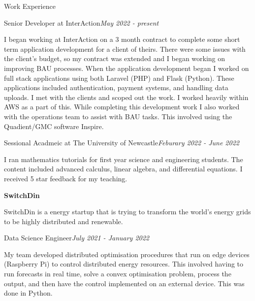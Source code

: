 \documentclass{resume} %
\begin{document}
\begin{rSection}{Work Experience}

    \begin{rSubsection}{Senior Developer at InterAction}{\em May 2022 - present}{}{}
        \item I began working at InterAction on a 3 month contract to complete some short term application development for a client of theirs.
        There were some issues with the client's budget, so my contract was extended and I began working on improving BAU processes.
        When the application development began I worked on full stack applications using both Laravel (PHP) and Flask (Python).
        These applications included authentication, payment systems, and handling data uploads.
        I met with the clients and scoped out the work. I worked heavily within AWS as a part of this.
        While completing this development work I also worked with the operations team to assist with BAU tasks.
        This involved using the Quadient/GMC software Inspire.
    \end{rSubsection}

    \begin{rSubsection}{Sessional Acadmeic at The University of Newcastle}{\em Feburary 2022 - June 2022}{}{}
        \item I ran mathematics tutorials for first year science and engineering students.
        The content included advanced calculus, linear algebra, and differential equations. I received 5 star feedback for my teaching.
    \end{rSubsection}

    {\bf SwitchDin}

    SwitchDin is a energy startup that is trying to transform the world's energy grids to be highly
    distributed and renewable.

    \begin{adjustwidth}{2em}{}
        \begin{rSubsection}{Data Science Engineer}{\em July 2021 - January 2022}{}{}
            \item My team developed distributed optimisation procedures that run on edge devices (Raspberry Pi) to control
            distributed energy resources. This involved having to run forecasts in real time, solve a convex optimisation problem, process the output, and
            then have the control implemented on an external device. This was done in Python.
        \end{rSubsection}


\end{adjustwidth}
\end{rSection}
\end{document}
